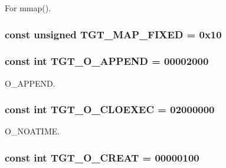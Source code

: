 For mmap(). \hypertarget{classArmLinux32_a0124e421d7846143bca15728b7a53e14}{
\subsubsection[{TGT\_\-MAP\_\-FIXED}]{\setlength{\rightskip}{0pt plus 5cm}const unsigned {\bf TGT\_\-MAP\_\-FIXED} = 0x10}}
\label{classArmLinux32_a0124e421d7846143bca15728b7a53e14}
\hypertarget{classArmLinux32_af11adc5404ea3780a5ce2829cc3710b7}{
\subsubsection[{TGT\_\-O\_\-APPEND}]{\setlength{\rightskip}{0pt plus 5cm}const int {\bf TGT\_\-O\_\-APPEND} = 00002000}}
\label{classArmLinux32_af11adc5404ea3780a5ce2829cc3710b7}


O\_\-APPEND. \hypertarget{classArmLinux32_a34aa7ec867a12296e12a851c47fb56d4}{
\subsubsection[{TGT\_\-O\_\-CLOEXEC}]{\setlength{\rightskip}{0pt plus 5cm}const int {\bf TGT\_\-O\_\-CLOEXEC} = 02000000}}
\label{classArmLinux32_a34aa7ec867a12296e12a851c47fb56d4}


O\_\-NOATIME. \hypertarget{classArmLinux32_aec02e04ca367e6c3f4b46e4edc12efac}{
\subsubsection[{TGT\_\-O\_\-CREAT}]{\setlength{\rightskip}{0pt plus 5cm}const int {\bf TGT\_\-O\_\-CREAT} = 00000100}}
\label{classArmLinux32_aec02e04ca367e6c3f4b46e4edc12efac}


